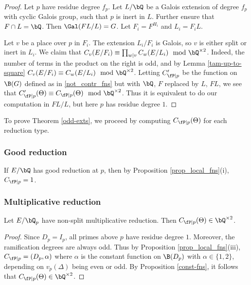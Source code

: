 \begin{proof}
Let $p$ have residue degree $f_p$. Let $L / \bQ$ be a Galois extension of degree $f_p$ with cyclic Galois group, such that $p$ is inert in $L$. Further ensure that $F \cap L = \bQ$. Then $\Gal(FL / L) = G$. Let $F_i = F^{H_i}$ and $L_i = F_i L$.

Let $v$ be a place over $p$ in $F_i$. The extension $L_i / F_i$ is Galois, so $v$ is either split or inert in $L_i$.
We claim that $C_v(E / F_i) \equiv \prod_{w | v} C_w(E / L_i) \mod \bQ^{\times 2}$. Indeed, the number of terms in the product on the right is odd, and by Lemma \ref{tam-up-to-square} $C_v(E / F_i) \equiv C_w(E / L_i) \mod \bQ^{\times 2}$. 
Letting $C_{\fP \mid p}'$ be the function on $\B(G)$ defined as in \eqref{not_contr_fns} but with $\bQ$, $F$ replaced by $L$, $FL$, we see that $C_{\fP \mid p}'(\Theta) \equiv C_{\fP \mid p}(\Theta) \mod \bQ^{\times 2}$. 
Thus it is equivalent to do our computation in $FL / L$, but here $p$ has residue degree $1$.
\end{proof}

To prove Theorem \ref{odd-exts}, we proceed by computing $C_{\fP \mid p}(\Theta)$ for each reduction type.

\subsubsection*{Good reduction}
If $E / \bQ$ has good reduction at $p$, then by Proposition \ref{prop_local_fns}(i), $C_{\fP \mid p} = 1$.

\subsubsection*{Multiplicative reduction}

\begin{lemma}
Let $E / \bQ_p$ have non-split multiplicative reduction. Then $C_{\fP \mid p}(\Theta) \in \bQ^{\times 2}$.
\end{lemma}

\begin{proof}
Since $D_p = I_p$, all primes above $p$ have residue degree $1$. Moreover, the ramification degrees are always odd. Thus by Proposition \ref{prop_local_fns}(iii), $C_{\fP \mid p}  = (D_p, \alpha)$
where $\alpha$ is the constant function on $\B(D_p)$ with $\alpha \in \{1, 2\}$, depending on $v_p(\Delta)$ being even or odd. By Proposition \ref{const-fns}, it follows that $C_{\fP \mid p}(\Theta) \in \bQ^{\times 2}$.
\end{proof}

